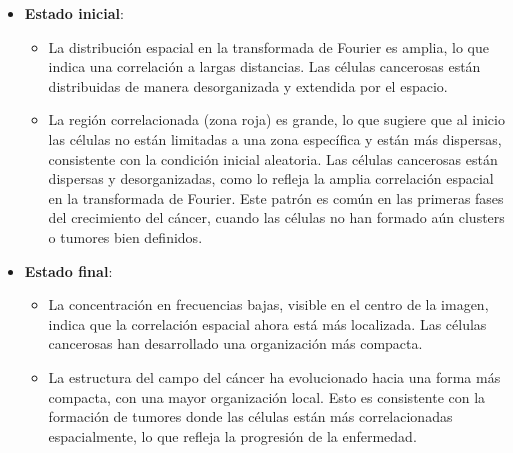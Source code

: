 \documentclass{article}
\begin{document}
\begin{itemize}
    \item \textbf{Estado inicial}:
    \begin{itemize}
        \item La distribución espacial en la transformada de Fourier es amplia, lo que indica una correlación a largas distancias. Las células cancerosas están distribuidas de manera desorganizada y extendida por el espacio.
        
        \item La región correlacionada (zona roja) es grande, lo que sugiere que al inicio las células no están limitadas a una zona específica y están más dispersas, consistente con la condición inicial aleatoria. Las células cancerosas están dispersas y desorganizadas, como lo refleja la amplia correlación espacial en la transformada de Fourier. Este patrón es común en las primeras fases del crecimiento del cáncer, cuando las células no han formado aún clusters o tumores bien definidos.
        

    \end{itemize}
    
    \item \textbf{Estado final}:
    \begin{itemize}
        \item La concentración en frecuencias bajas, visible en el centro de la imagen, indica que la correlación espacial ahora está más localizada. Las células cancerosas han desarrollado una organización más compacta.
       \item La estructura del campo del cáncer ha evolucionado hacia una forma más compacta, con una mayor organización local. Esto es consistente con la formación de tumores donde las células están más correlacionadas espacialmente, lo que refleja la progresión de la enfermedad.
    \end{itemize}


\end{itemize}
\end{document}
